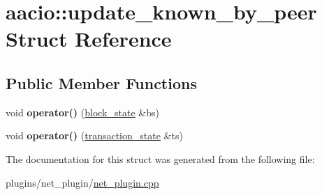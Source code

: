 \hypertarget{structaacio_1_1update__known__by__peer}{}\section{aacio\+:\+:update\+\_\+known\+\_\+by\+\_\+peer Struct Reference}
\label{structaacio_1_1update__known__by__peer}
\subsection*{Public Member Functions}
\begin{DoxyCompactItemize}
\item 
\mbox{\label{structaacio_1_1update__known__by__peer_a7dae6b27e891da0a73b78b16c66d28c3}} 
void {\bfseries operator()} (\mbox{\hyperlink{structaacio_1_1block__state}{block\+\_\+state}} \&bs)
\item 
\mbox{\label{structaacio_1_1update__known__by__peer_a4dc2aecfbc348a534e0185f55f013892}} 
void {\bfseries operator()} (\mbox{\hyperlink{structaacio_1_1transaction__state}{transaction\+\_\+state}} \&ts)
\end{DoxyCompactItemize}


The documentation for this struct was generated from the following file\+:\begin{DoxyCompactItemize}
\item 
plugins/net\+\_\+plugin/\mbox{\hyperlink{net__plugin_8cpp}{net\+\_\+plugin.\+cpp}}\end{DoxyCompactItemize}

